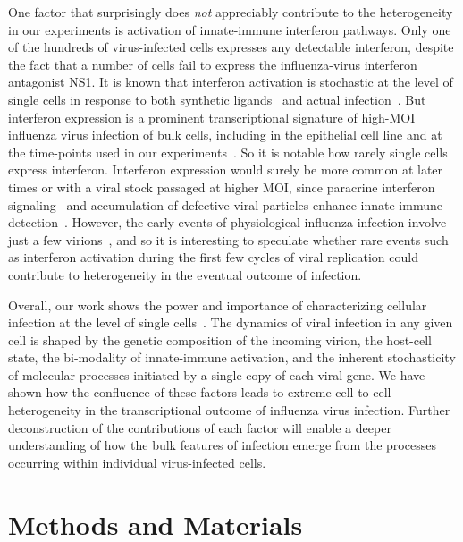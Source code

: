 \documentclass[9pt,lineno]{elife}
\begin{document}
One factor that surprisingly does \emph{not} appreciably contribute to the heterogeneity in our experiments is activation of innate-immune interferon pathways.
Only one of the hundreds of virus-infected cells expresses any detectable interferon, despite the fact that a number of cells fail to express the influenza-virus interferon antagonist NS1.
It is known that interferon activation is stochastic at the level of single cells in response to both synthetic ligands~\citep{shalek2013single,shalek2014single,bhushal2017cell,hagai2017gene} and actual infection~\citep{Rand:2012kl,PerezCidoncha:2014jr,avraham2015pathogen,Killip:2017ef}.
But interferon expression is a prominent transcriptional signature of high-MOI influenza virus infection of bulk cells, including in the epithelial cell line and at the time-points used in our experiments~\citep{Geiss:2002a,sutejo2012activation}.
So it is notable how rarely single cells express interferon.
Interferon expression would surely be more common at later times or with a viral stock passaged at higher MOI, since paracrine interferon signaling~\citep{crotta2013type} and accumulation of defective viral particles enhance innate-immune detection~\citep{Tapia:2013kf,Lopez:2014en}.
However, the early events of physiological influenza infection involve just a few virions~\citep{varble2014influenza,mccrone2017evolutionary}, and so it is interesting to speculate whether rare events such as interferon activation during the first few cycles of viral replication could contribute to heterogeneity in the eventual outcome of infection.

Overall, our work shows the power and importance of characterizing cellular infection at the level of single cells~\citep{avraham2015pathogen}.
The dynamics of viral infection in any given cell is shaped by the genetic composition of the incoming virion, the host-cell state, the bi-modality of innate-immune activation, and the inherent stochasticity of molecular processes initiated by a single copy of each viral gene.
We have shown how the confluence of these factors leads to extreme cell-to-cell heterogeneity in the transcriptional outcome of influenza virus infection.
Further deconstruction of the contributions of each factor will enable a deeper understanding of how the bulk features of infection emerge from the processes occurring within individual virus-infected cells.

\section{Methods and Materials}
\end{document}
